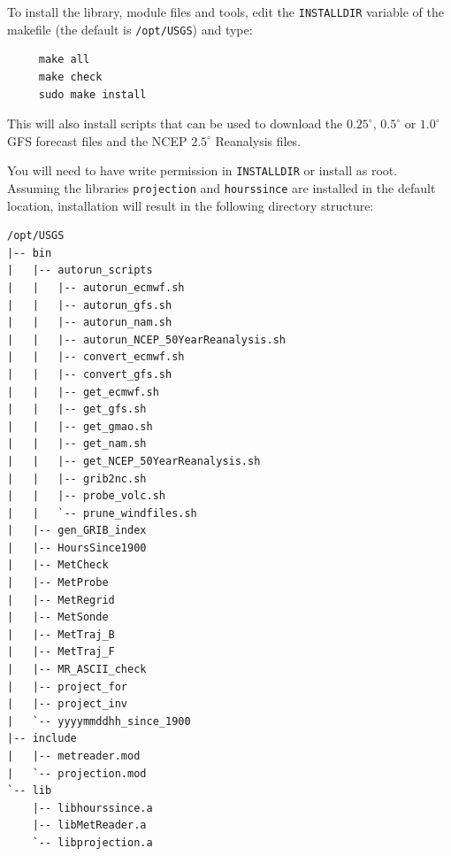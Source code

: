 \documentclass[11pt]{article}   %
\begin{document}
To install the library, module files and tools, edit the \texttt{INSTALLDIR} variable of
the makefile (the default is \texttt{/opt/USGS}) and type:
\begin{verbatim}
     make all
     make check
     sudo make install
\end{verbatim}
This will also install scripts that can be used to download the $0.25^{\circ}$, $0.5^{\circ}$ or $1.0^{\circ}$ GFS
forecast files and the NCEP $2.5^{\circ}$ Reanalysis files.

You will need to have write permission in \texttt{INSTALLDIR}
or install as root.  Assuming the libraries \texttt{projection} and \texttt{hourssince} are
installed in the default location, installation will result in the following
directory structure:
\begin{verbatim}
/opt/USGS
|-- bin
|   |-- autorun_scripts
|   |   |-- autorun_ecmwf.sh
|   |   |-- autorun_gfs.sh
|   |   |-- autorun_nam.sh
|   |   |-- autorun_NCEP_50YearReanalysis.sh
|   |   |-- convert_ecmwf.sh
|   |   |-- convert_gfs.sh
|   |   |-- get_ecmwf.sh
|   |   |-- get_gfs.sh
|   |   |-- get_gmao.sh
|   |   |-- get_nam.sh
|   |   |-- get_NCEP_50YearReanalysis.sh
|   |   |-- grib2nc.sh
|   |   |-- probe_volc.sh
|   |   `-- prune_windfiles.sh
|   |-- gen_GRIB_index
|   |-- HoursSince1900
|   |-- MetCheck
|   |-- MetProbe
|   |-- MetRegrid
|   |-- MetSonde
|   |-- MetTraj_B
|   |-- MetTraj_F
|   |-- MR_ASCII_check
|   |-- project_for
|   |-- project_inv
|   `-- yyyymmddhh_since_1900
|-- include
|   |-- metreader.mod
|   `-- projection.mod
`-- lib
    |-- libhourssince.a
    |-- libMetReader.a
    `-- libprojection.a
\end{verbatim}
\end{document}
